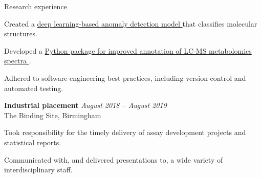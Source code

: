 \documentclass{resume}
\begin{document}
\begin{rSection}{Research experience}
\vspace{2pt plus 1pt minus 1pt}
\item Created a \href{https://github.com/jackgisby/deepmet}{deep learning-based anomaly detection model \faGithub} that classifies molecular structures.
\item Developed a \href{https://github.com/jackgisby/metaboblend}{Python package for improved annotation of LC-MS metabolomics spectra \faGithub}.
\item Adhered to software engineering best practices, including version control and automated testing.

\textbf{Industrial placement} \hfill \textit{August 2018 -- August 2019} \\
The Binding Site, Birmingham

\vspace{2pt plus 1pt minus 1pt}
\item Took responsibility for the timely delivery of assay development projects and statistical reports.
\item Communicated with, and delivered presentations to, a wide variety of interdisciplinary staff.

\end{rSection}
\end{document}
